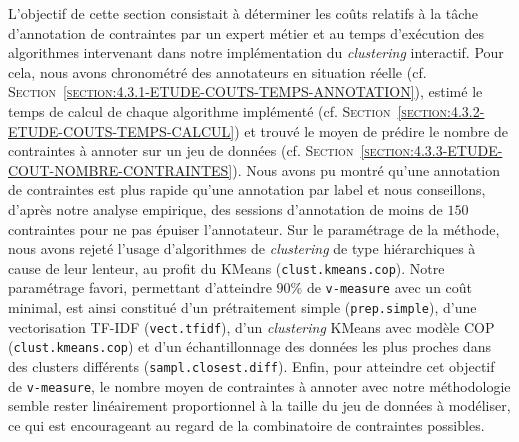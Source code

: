 			L'objectif de cette section consistait à déterminer les coûts relatifs à la tâche d'annotation de contraintes par un expert métier et au temps d'exécution des algorithmes intervenant dans notre implémentation du \textit{clustering} interactif.
			Pour cela, nous avons chronométré des annotateurs en situation réelle (cf. \textsc{Section~\ref{section:4.3.1-ETUDE-COUTS-TEMPS-ANNOTATION}}), estimé le temps de calcul de chaque algorithme implémenté (cf. \textsc{Section~\ref{section:4.3.2-ETUDE-COUTS-TEMPS-CALCUL}}) et trouvé le moyen de prédire le nombre de contraintes à annoter sur un jeu de données (cf. \textsc{Section~\ref{section:4.3.3-ETUDE-COUT-NOMBRE-CONTRAINTES}}).
			Nous avons pu montré qu'une annotation de contraintes est plus rapide qu'une annotation par label et nous conseillons, d'après notre analyse empirique, des sessions d'annotation de moins de $150$ contraintes pour ne pas épuiser l'annotateur.
			Sur le paramétrage de la méthode, nous avons rejeté l'usage d'algorithmes de \textit{clustering} de type hiérarchiques à cause de leur lenteur, au profit du KMeans (\texttt{clust.kmeans.cop}).
			Notre paramétrage favori, permettant d'atteindre $90$\% de \texttt{v-measure} avec un coût minimal, est ainsi constitué d'un prétraitement simple (\texttt{prep.simple}), d'une vectorisation TF-IDF (\texttt{vect.tfidf}), d'un \textit{clustering} KMeans avec modèle COP (\texttt{clust.kmeans.cop}) et d'un échantillonnage des données les plus proches dans des clusters différents (\texttt{sampl.closest.diff}).
			Enfin, pour atteindre cet objectif de \texttt{v-measure}, le nombre moyen de contraintes à annoter avec notre méthodologie semble rester linéairement proportionnel à la taille du jeu de données à modéliser, ce qui est encourageant au regard de la combinatoire de contraintes possibles.
			\\
			
